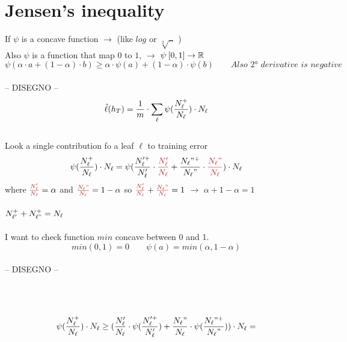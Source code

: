 \documentclass[../main.tex]{subfiles}
\begin{document}
\section{Jensen’s inequality}
If $\psi$ is a concave function $\longrightarrow $ (like $log$ or $\sqrt[2]{..}$ )\\
Also $\psi$ is a function that map $0$ to $1$, \quad $\longrightarrow$ \quad $\psi\:[0,1]\rightarrow \mathbb{R}$\\
$$
\psi(\alpha \cdot a + (1-\alpha) \cdot b ) \geq \alpha \cdot \psi(a) + (1-\alpha) \cdot \psi(b)
\qquad \textit{Also 2° derivative is negative}$$
\\
-- DISEGNO --
\\
$$ \hat{\ell}(h_T) = \frac{1}{m} \cdot \sum_{\ell}{} \psi  (\frac{N_{\ell}^+}{N_{\ell}}) \cdot N_{\ell}
$$
\\
Look  a single contribution fo a leaf $\ell$ to training error
\\
$$
\psi(\frac{\nl^+}{\nl}) \cdot \nl = \psi(\frac{\nl'^+}{\nl'} \cdot \red{\frac{\nl'}{\nl}} + \frac{\nl"^+}{\nl"} \cdot \red{\frac{\nl"}{\nl}}) \cdot \nl
$$
where $\red{\frac{\nl'}{\nl}} = \alpha$ and $\red{\frac{\nl"}{\nl}} = 1-\alpha$ \qquad so \quad $\red{\frac{\nl'}{\nl}} + \red{\frac{\nl"}{\nl}} = 1$ \qquad $\longrightarrow$ $\alpha + 1 -\alpha = 1$
\\\\
$N_{\ell'}^+ + N_{\ell"}^+ = N_{\ell}
$ 
\\\\
I want to check function $min$ concave between 0 and 1.\\
$$min (0,1) = 0  \qquad \psi(a) = min(\alpha, 1- \alpha) $$
\\ -- DISEGNO --
\\\\
\\\\
$$
\psi(\frac{N_{\ell}^+}{N_{\ell}}) \cdot N_{\ell} 
\geq 
(\frac{N_{\ell}'}{N_{\ell}} \cdot \psi (\frac{N_{\ell}'^+}{N_{\ell}'})
+ 
\frac{N_{\ell}"}{N_{\ell}}\cdot \psi(\frac{N_{\ell}"^+}{N_{\ell}"})) \cdot N_{\ell} =
$$
\end{document}
